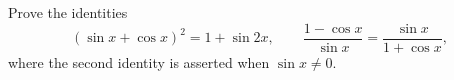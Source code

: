 Prove the identities
\[(\sin x+\cos x)^2=1+\sin2x,\qquad \dfrac{1-\cos x}{\sin x}=\dfrac{\sin x}{1+\cos x},\]
where the second identity is asserted when $\sin x\ne0$.
